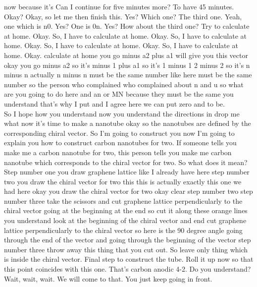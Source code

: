 now because it's Can I continue for five minutes more? To have 45 minutes. Okay? Okay, so let me then finish this. Yes? Which one? The third one. Yeah, one which is n0. Yes? One is 0n. Yes? How about the third one? Try to calculate at home. Okay. So, I have to calculate at home. Okay. So, I have to calculate at home. Okay. So, I have to calculate at home. Okay. So, I have to calculate at home. Okay. calculate at home you go minus a2 plus a1 will give you this vector okay you go minus a2 so it's minus 1 plus a1 so it's 1 minus 1 2 minus 2 so it's n minus n actually n minus n must be the same number like here must be the same number so the person who complained who complained about n and u so what are you going to do here and an or MN because they must be the same you understand that's why I put and I agree here we can put zero and to be.\\
So I hope how you understand now you understand the directions in drop me what now it's time to make a nanotube okay so the nanotubes are defined by the corresponding chiral vector. So I'm going to construct you now I'm going to explain you how to construct carbon nanotubes for two. If someone tells you make me a carbon nanotube for two, this person tells you make me carbon nanotube which corresponds to the chiral vector for two. So what does it mean? Step number one you draw graphene lattice like I already have here step number two you draw the chiral vector for two this this is actually exactly this one we had here okay you draw the chiral vector for two okay clear step number two step number three take the scissors and cut graphene lattice perpendicularly to the chiral vector going at the beginning at the end so cut it along these orange lines you understand look at the beginning of the chiral vector and end cut graphene lattice perpendicularly to the chiral vector so here is the 90 degree angle going through the end of the vector and going through the beginning of the vector step number three throw away this thing that you cut out. So leave only thing which is inside the chiral vector. Final step to construct the tube. Roll it up now so that this point coincides with this one. That's carbon anodic 4-2. Do you understand? Wait, wait, wait. We will come to that. You just keep going in front.
